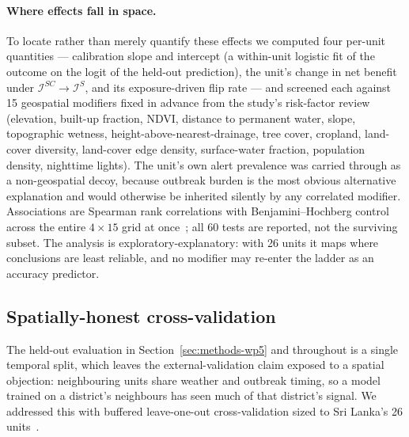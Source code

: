 \documentclass[11pt,a4paper]{article}
\begin{document}
\paragraph{Where effects fall in space.} To locate rather than merely quantify these effects we computed four per-unit quantities --- calibration slope and intercept (a within-unit logistic fit of the outcome on the logit of the held-out prediction), the unit's change in net benefit under $\mathcal I^{SC}\to\mathcal I^{S}$, and its exposure-driven flip rate --- and screened each against 15 geospatial modifiers fixed in advance from the study's risk-factor review (elevation, built-up fraction, NDVI, distance to permanent water, slope, topographic wetness, height-above-nearest-drainage, tree cover, cropland, land-cover diversity, land-cover edge density, surface-water fraction, population density, nighttime lights). The unit's own alert prevalence was carried through as a non-geospatial decoy, because outbreak burden is the most obvious alternative explanation and would otherwise be inherited silently by any correlated modifier. Associations are Spearman rank correlations with Benjamini--Hochberg control across the entire $4\times15$ grid at once~\cite{BenjaminiHochberg1995}; all 60 tests are reported, not the surviving subset. The analysis is exploratory-explanatory: with 26 units it maps where conclusions are least reliable, and no modifier may re-enter the ladder as an accuracy predictor.

\subsection{Spatially-honest cross-validation}\label{sec:methods-wp4}
The held-out evaluation in Section~\ref{sec:methods-wp5} and throughout is a single temporal split, which leaves the external-validation claim exposed to a spatial objection: neighbouring units share weather and outbreak timing, so a model trained on a district's neighbours has seen much of that district's signal. We addressed this with buffered leave-one-out cross-validation sized to Sri Lanka's 26 units~\cite{Roberts2017,Valavi2019}.
\end{document}
